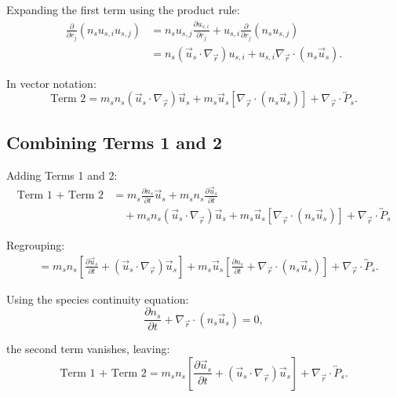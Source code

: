 Expanding the first term using the product rule:
\begin{align*}
\frac{\partial}{\partial r_j} (n_s u_{s,i} u_{s,j}) &= n_s u_{s,j} \frac{\partial u_{s,i}}{\partial r_j} + u_{s,i} \frac{\partial}{\partial r_j}(n_s u_{s,j})  \\
&= n_s (\vec{u}_s \cdot \nabla_{\vec{r}}) u_{s,i} + u_{s,i} \nabla_{\vec{r}} \cdot (n_s \vec{u}_s).
\end{align*}

In vector notation:
\begin{equation*}
\text{Term 2} = m_s n_s (\vec{u}_s \cdot \nabla_{\vec{r}}) \vec{u}_s + m_s \vec{u}_s [\nabla_{\vec{r}} \cdot (n_s \vec{u}_s)] + \nabla_{\vec{r}} \cdot \overleftrightarrow{P}_s.
\end{equation*}

\subsection*{Combining Terms 1 and 2}

Adding Terms 1 and 2:
\begin{align*}
\text{Term 1 + Term 2} &= m_s \frac{\partial n_s}{\partial t} \vec{u}_s + m_s n_s \frac{\partial \vec{u}_s}{\partial t}  \\
&\quad + m_s n_s (\vec{u}_s \cdot \nabla_{\vec{r}}) \vec{u}_s + m_s \vec{u}_s [\nabla_{\vec{r}} \cdot (n_s \vec{u}_s)] + \nabla_{\vec{r}} \cdot \overleftrightarrow{P}_s
\end{align*}

Regrouping:
\begin{align*}
&= m_s n_s \left[ \frac{\partial \vec{u}_s}{\partial t} + (\vec{u}_s \cdot \nabla_{\vec{r}}) \vec{u}_s \right] + m_s \vec{u}_s \left[ \frac{\partial n_s}{\partial t} + \nabla_{\vec{r}} \cdot (n_s \vec{u}_s) \right] + \nabla_{\vec{r}} \cdot \overleftrightarrow{P}_s.
\end{align*}

Using the species continuity equation:
\begin{equation*}
\frac{\partial n_s}{\partial t} + \nabla_{\vec{r}} \cdot (n_s \vec{u}_s) = 0,
\end{equation*}

the second term vanishes, leaving:
\begin{equation*}
\text{Term 1 + Term 2} = m_s n_s \left[ \frac{\partial \vec{u}_s}{\partial t} + (\vec{u}_s \cdot \nabla_{\vec{r}}) \vec{u}_s \right] + \nabla_{\vec{r}} \cdot \overleftrightarrow{P}_s.
\end{equation*}


